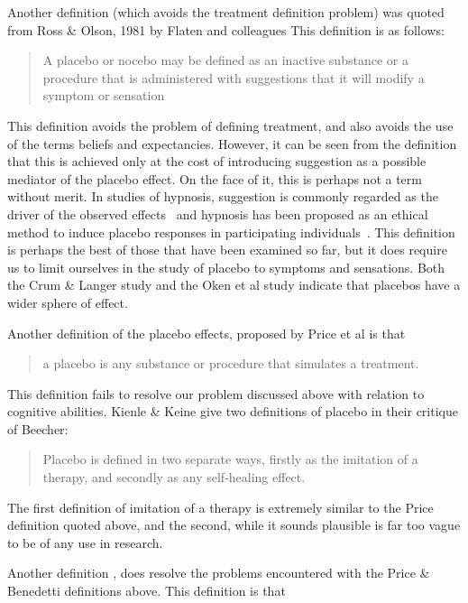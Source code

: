 Another definition (which avoids the treatment definition problem) was quoted from Ross \& Olson, 1981 by Flaten and colleagues \cite{Flaten1999}
This definition is as follows:

\begin{quotation}
  A placebo or nocebo may be defined as an inactive
substance or a procedure that is administered with
suggestions that it will modify a symptom or sensation
\end{quotation}

This definition avoids the problem of defining treatment, and also avoids the use of the terms beliefs and expectancies. However, it can be seen from the definition that this is achieved only at the cost of introducing suggestion as a possible mediator of the placebo effect. On the face of it, this is perhaps not a term without merit. In studies of hypnosis, suggestion is commonly regarded as the driver of the observed effects~\cite{Kirsch1994} and hypnosis has been proposed as an ethical method to induce placebo responses in participating individuals~\cite{Raz2007a}. This definition is perhaps the best of those that have been examined so far, but it does require us to limit ourselves in the study of placebo to symptoms and sensations. Both the Crum \& Langer study and the Oken et al study indicate that placebos have a wider sphere of effect. 


Another definition of the placebo effects,  proposed by Price et al \cite{Price2008} is that

\begin{quotation}
  a placebo is any substance or procedure that simulates a treatment.
\end{quotation}

This definition fails to resolve our problem discussed above with relation to cognitive abilities. 
Kienle \& Keine give two definitions of placebo in their critique of Beecher:

\begin{quotation}
Placebo is defined in two separate ways, firstly as the imitation of a
therapy, and secondly as any self-healing effect. 
\end{quotation}

The first definition of imitation of a therapy is extremely similar to the Price definition quoted above, and the second, while it sounds plausible is far too vague to be of any use in research.

Another definition \cite{Blasi2001}, does resolve the problems encountered with the Price \& Benedetti  definitions above. This definition is that

